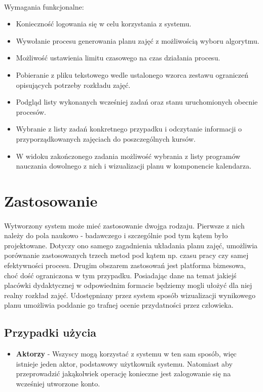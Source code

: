 \paragraph{}Wymagania funkcjonalne:
\begin{itemize}
\item Konieczność logowania się w celu korzystania z systemu.
\item Wywołanie procesu generowania planu zajęć z możliwością wyboru algorytmu.
\item Możliwość ustawienia limitu czasowego na czas działania procesu.
\item Pobieranie z pliku tekstowego wedle ustalonego wzorca zestawu ograniczeń opisujących potrzeby rozkładu zajęć.
\item Podgląd listy wykonanych wcześniej zadań oraz stanu uruchomionych obecnie procesów.
\item Wybranie z listy zadań konkretnego przypadku i odczytanie informacji o przyporządkowanych zajęciach do poszczególnych kursów.
\item W widoku zakończonego zadania możliwość wybrania z listy programów nauczania dowolnego z nich i wizualizacji planu w komponencie kalendarza.
\end{itemize}
\section{Zastosowanie}
\paragraph{}Wytworzony system może mieć zastosowanie dwojga rodzaju. Pierwsze z nich należy do pola naukowo - badawczego i szczególnie pod tym kątem było projektowane. Dotyczy ono samego zagadnienia układania planu zajęć, umożliwia porównanie zastosowanych trzech metod pod kątem np. czasu pracy czy samej efektywności procesu. Drugim obszarem zastosowań jest platforma biznesowa, choć dość ograniczona w tym przypadku. Posiadając dane na temat jakiejś placówki dydaktycznej w odpowiednim formacie będziemy mogli ułożyć dla niej realny rozkład zajęć. Udostępniany przez system sposób wizualizacji wynikowego planu umożliwia poddanie go trafnej ocenie przydatności przez człowieka.
\subsection{Przypadki użycia}
\begin{itemize}
\item{\textbf{Aktorzy}} - Wszyscy mogą korzystać z systemu w ten sam sposób, więc istnieje jeden aktor, podstawowy użytkownik systemu. Natomiast aby przeprowadzić jakąkolwiek operację konieczne jest zalogowanie się na wcześniej utworzone konto.
\end{itemize}
